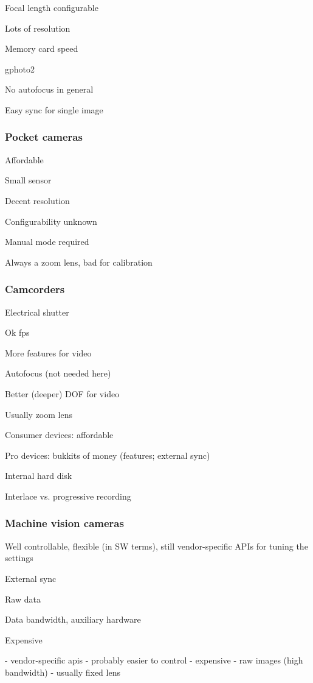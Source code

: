 Focal length configurable

Lots of resolution

Memory card speed

gphoto2

No autofocus in general

Easy sync for single image

\subsubsection{Pocket cameras}

Affordable

Small sensor

Decent resolution

Configurability unknown

Manual mode required

Always a zoom lens, bad for calibration


\subsubsection{Camcorders}

Electrical shutter

Ok fps

More features for video

Autofocus (not needed here)

Better (deeper) DOF for video

Usually zoom lens

Consumer devices: affordable

Pro devices: bukkits of money (features; external sync)

Internal hard disk

Interlace vs. progressive recording

\subsubsection{Machine vision cameras}

Well controllable, flexible (in SW terms), still vendor-specific APIs for tuning the settings

External sync

Raw data

Data bandwidth, auxiliary hardware

Expensive

- vendor-specific apis
- probably easier to control
- expensive
- raw images (high bandwidth)
- usually fixed lens
